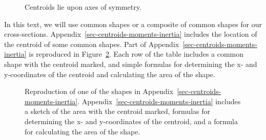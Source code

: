 \documentclass[
  letterpaper,
  DIV=11,
  numbers=noendperiod]{scrreprt}
\theoremstyle{definition}
\theoremstyle{remark}
\begin{document}
\begin{figure}


\caption{\label{fig-8.2}Centroids lie upon axes of symmetry.}

\end{figure}%

In this text, we will use common shapes or a composite of common shapes
for our cross-sections. Appendix~\ref{sec-centroids-moments-inertia}
includes the location of the centroid of some common shapes. Part of
Appendix~\ref{sec-centroids-moments-inertia} is reproduced in
Figure~\ref{fig-8.3}. Each row of the table includes a common shape with
the centroid marked, and simple formulas for determining the x- and
y-coordinates of the centroid and calculating the area of the shape.

\begin{figure}


\caption{\label{fig-8.3}Reproduction of one of the shapes in
Appendix~\ref{sec-centroids-moments-inertia}.
Appendix~\ref{sec-centroids-moments-inertia} includes a sketch of the
area with the centroid marked, formulas for determining the x- and
y-coordinates of the centroid, and a formula for calculating the area of
the shape.}

\end{figure}%
\end{document}
